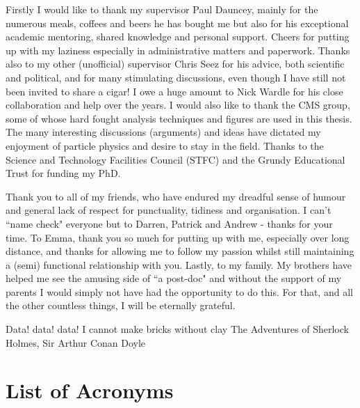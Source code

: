 \begin{acknowledgements}
  Firstly I would like to thank my supervisor Paul Dauncey, mainly for the numerous meals, coffees and beers he has bought me but also for his exceptional academic mentoring, shared knowledge and personal support. Cheers for putting up with my laziness especially in administrative matters and paperwork. Thanks also to my other (unofficial) supervisor Chris Seez for his advice, both scientific and political, and for many stimulating discussions, even though I have still not been invited to share a cigar! I owe a huge amount to Nick Wardle for his close collaboration and help over the years. I would also like to thank the CMS \Hgg group, some of whose hard fought analysis techniques and figures are used in this thesis. The many interesting discussions (arguments) and ideas have dictated my enjoyment of particle physics and desire to stay in the field. Thanks to the Science and Technology Facilities Council (STFC) and the Grundy Educational Trust for funding my PhD.

  Thank you to all of my friends, who have endured my dreadful sense of humour and general lack of respect for punctuality, tidiness and organisation. I can't ``name check" everyone but to Darren, Patrick and Andrew - thanks for your time. To Emma, thank you so much for putting up with me, especially over long distance, and thanks for allowing me to follow my passion whilst still maintaining a (semi) functional relationship with you. Lastly, to my family. My brothers have helped me see the amusing side of ``a post-doc" and without the support of my parents I would simply not have had the opportunity to do this. For that, and all the other countless things, I will be eternally grateful.

\end{acknowledgements}




\frontquote%
  {Data! data! data! I cannot make bricks without clay}
  {The Adventures of Sherlock Holmes, Sir Arthur Conan Doyle}

\tableofcontents
\listoffigures
\listoftables
\newpage
{}
\chapter*{List of Acronyms}


\newpage
\thispagestyle{empty}
\mbox{}
